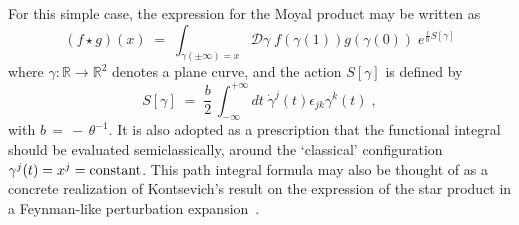 \documentclass[a4paper,12pt]{article}
\begin{document}
For this simple case, the expression for the Moyal product may be
written as
\begin{equation}
   \label{eq:frep}
(f \star g)(x)\;=\; \int_{\gamma(\pm \infty)=x} {\mathcal D}\gamma
\; f(\gamma(1)) g(\gamma(0)) \; e^{\frac{i}{\hbar}S[\gamma]} 
\end{equation}
where $\gamma:{\mathbb R}\to\mathbb{R}^2$ denotes a plane curve,
and the
action $S[\gamma]$ is defined by
\begin{equation}
  \label{eq:frep1}
S[\gamma]\;=\; \frac{b}{2} \, \int_{-\infty}^{+\infty} dt \; {\dot
\gamma}^j(t) \epsilon_{jk} \gamma^k(t) \;, 
\end{equation}
with $b \,=\,-\,\theta^{-1}$. It is also adopted as a prescription
that the
functional integral should be evaluated semiclassically, around the
`classical' configuration \mbox{$\gamma^j (t) = x^j = {\rm
constant}$}.
This path integral formula may also be thought of as a concrete
realization of Kontsevich's result on the expression of the star
product in a Feynman-like perturbation expansion~\cite{kontsevich}.
\end{document}

